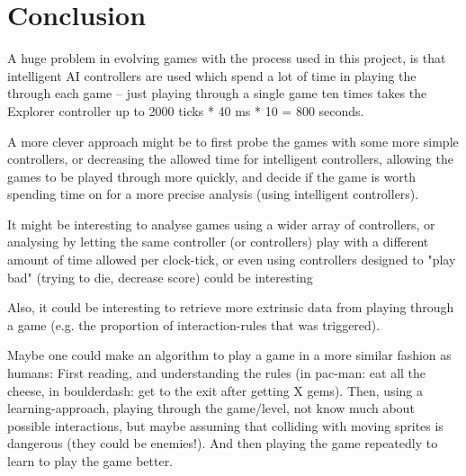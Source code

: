 \documentclass[a4paper,titlepage,final]{report}
\begin{document}
\chapter{Conclusion}

A huge problem in evolving games with the process used in this project, is that intelligent AI controllers are used which spend a lot of time in playing the through each game -- just playing through a single game ten times takes the Explorer controller up to 2000 ticks * 40 ms * 10 = 800 seconds.

A more clever approach might be to first probe the games with some more simple controllers, or decreasing the allowed time for intelligent controllers, allowing the games to be played through more quickly, and decide if the game is worth spending time on for a more precise analysis (using intelligent controllers).

It might be interesting to analyse games using a wider array of controllers, or analysing by letting the same controller (or controllers) play with a different amount of time allowed per clock-tick, or even using controllers designed to "play bad" (trying to die, decrease score) could be interesting

Also, it could be interesting to retrieve more extrinsic data from playing through a game (e.g. the proportion of interaction-rules that was triggered).


Maybe one could make an algorithm to play a game in a more similar fashion as humans:
First reading, and understanding the rules (in pac-man: eat all the cheese, in boulderdash: get to the exit after getting X gems).
Then, using a learning-approach, playing through the game/level, not know much about possible interactions, but maybe assuming that colliding with moving sprites is dangerous (they could be enemies!).
And then playing the game repeatedly to learn to play the game better.


\end{document}

